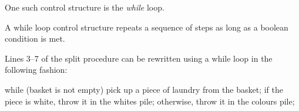 One such control structure is the \emph{while} loop.

\begin{definition}

A while loop control structure repeats a sequence of steps as long as a boolean
condition is met.

\end{definition}

Lines 3--7 of the split procedure can be rewritten using a while loop in the
following fashion:

\begin{code}
while (basket is not empty)
{
  pick up a piece of laundry from the basket;
  if the piece is white, throw it in the whites pile;
  otherwise, throw it in the colours pile;
}
\end{code}
